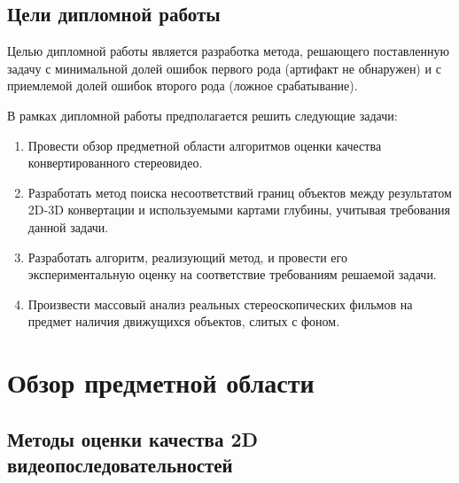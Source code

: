 \documentclass[14pt, a4paper]{extarticle}
\begin{document}
\subsection{Цели дипломной работы}

Целью дипломной работы является разработка метода, решающего поставленную задачу 
с минимальной долей ошибок первого рода (артифакт не обнаружен) и 
с приемлемой долей ошибок второго рода (ложное срабатывание).

В рамках дипломной работы предполагается решить следующие задачи:

\begin{enumerate}
	\item Провести обзор предметной области алгоритмов оценки качества конвертированного стереовидео.
	\item Разработать метод поиска несоответствий границ объектов между результатом 2D-3D конвертации 
	и используемыми картами глубины, учитывая требования данной задачи.
	\item Разработать алгоритм, реализующий метод, и провести его экспериментальную оценку 
	на соответствие требованиям решаемой задачи.
	\item Произвести массовый анализ реальных стереоскопических фильмов 
	на предмет наличия движущихся объектов, слитых с фоном.
\end{enumerate}


\newpage
\section{Обзор предметной области}

\subsection{Методы оценки качества 2D видеопоследовательностей}
\end{document}
